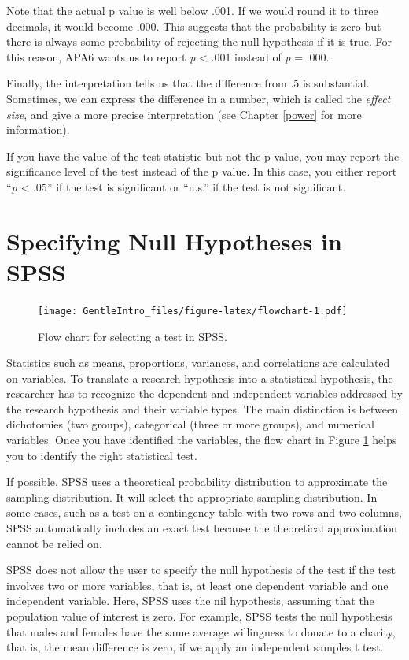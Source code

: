 \documentclass[a4paper]{book}
\theoremstyle{definition}
\theoremstyle{definition}
\theoremstyle{definition}
\theoremstyle{remark}
\begin{document}
Note that the actual p value is well below .001. If we would round it to
three decimals, it would become .000. This suggests that the probability
is zero but there is always some probability of rejecting the null
hypothesis if it is true. For this reason, APA6 wants us to report
\emph{p} \textless{} .001 instead of \emph{p} = .000.

Finally, the interpretation tells us that the difference from .5 is
substantial. Sometimes, we can express the difference in a number, which
is called the \emph{effect size}, and give a more precise interpretation
(see Chapter \ref{power} for more information).

If you have the value of the test statistic but not the p value, you may
report the significance level of the test instead of the p value. In
this case, you either report ``\emph{p} \textless{} .05'' if the test is
significant or ``n.s.'' if the test is not significant.

\section{Specifying Null Hypotheses in SPSS}\label{nullSPSS}

\begin{figure}
\centering
\texttt{[image: GentleIntro\_files/figure-latex/flowchart-1.pdf]}
\caption{\label{fig:flowchart}Flow chart for selecting a test in SPSS.}
\end{figure}

Statistics such as means, proportions, variances, and correlations are
calculated on variables. To translate a research hypothesis into a
statistical hypothesis, the researcher has to recognize the dependent
and independent variables addressed by the research hypothesis and their
variable types. The main distinction is between dichotomies (two
groups), categorical (three or more groups), and numerical variables.
Once you have identified the variables, the flow chart in Figure
\ref{fig:flowchart} helps you to identify the right statistical test.

If possible, SPSS uses a theoretical probability distribution to
approximate the sampling distribution. It will select the appropriate
sampling distribution. In some cases, such as a test on a contingency
table with two rows and two columns, SPSS automatically includes an
exact test because the theoretical approximation cannot be relied on.

SPSS does not allow the user to specify the null hypothesis of the test
if the test involves two or more variables, that is, at least one
dependent variable and one independent variable. Here, SPSS uses the nil
hypothesis, assuming that the population value of interest is zero. For
example, SPSS tests the null hypothesis that males and females have the
same average willingness to donate to a charity, that is, the mean
difference is zero, if we apply an independent samples t test.
\end{document}
